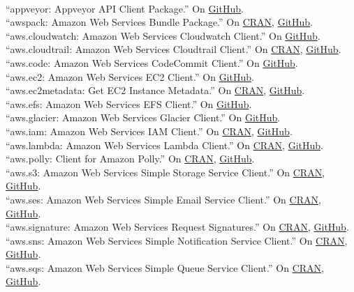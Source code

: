 \documentclass[12pt]{article}
\newcommand{\topic}[1]{\pagebreak[3]\indent {\color{lg}{\footnotesize #1 }}\\}
\newcommand{\entry}[1]{\indent {\color{lg}\guillemotright}\hspace{2pt}#1\vspace{.25em}\\}
\begin{document}
	\topic{R packages contributed to the cloudyr project}
	\entry{``appveyor: Appveyor API Client Package.'' On \href{https://github.com/cloudyr/appveyor}{GitHub}.}
	\entry{``awspack: Amazon Web Services Bundle Package.'' On \href{https://cran.r-project.org/package=awspack}{CRAN}, \href{https://github.com/cloudyr/awspack}{GitHub}.}
	\entry{``aws.cloudwatch: Amazon Web Services Cloudwatch Client.'' On \href{https://github.com/cloudyr/aws.cloudwatch}{GitHub}.}
	\entry{``aws.cloudtrail: Amazon Web Services Cloudtrail Client.'' On \href{https://cran.r-project.org/package=aws.cloudtrail}{CRAN}, \href{https://github.com/cloudyr/aws.cloudtrail}{GitHub}.}
	\entry{``aws.code: Amazon Web Services CodeCommit Client.'' On \href{https://github.com/cloudyr/aws.code}{GitHub}.}
	\entry{``aws.ec2: Amazon Web Services EC2 Client.'' On \href{https://github.com/cloudyr/aws.ec2}{GitHub}.}
	\entry{``aws.ec2metadata: Get EC2 Instance Metadata.'' On \href{https://cran.r-project.org/package=aws.ec2metadata}{CRAN}, \href{https://github.com/cloudyr/aws.ec2metadata}{GitHub}.}
	\entry{``aws.efs: Amazon Web Services EFS Client.'' On \href{https://github.com/cloudyr/aws.efs}{GitHub}.}
	\entry{``aws.glacier: Amazon Web Services Glacier Client.'' On \href{https://github.com/cloudyr/aws.glacier}{GitHub}.}
	\entry{``aws.iam: Amazon Web Services IAM Client.'' On \href{https://cran.r-project.org/package=aws.iam}{CRAN}, \href{https://github.com/cloudyr/aws.iam}{GitHub}.}
	\entry{``aws.lambda: Amazon Web Services Lambda Client.'' On \href{https://cran.r-project.org/package=aws.lambda}{CRAN}, \href{https://github.com/cloudyr/aws.lambda}{GitHub}.}
	\entry{``aws.polly: Client for Amazon Polly.'' On \href{https://cran.r-project.org/package=polly}{CRAN}, \href{https://github.com/cloudyr/aws.polly}{GitHub}.}
	\entry{``aws.s3: Amazon Web Services Simple Storage Service Client.'' On \href{https://cran.r-project.org/package=aws.s3}{CRAN}, \href{https://github.com/cloudyr/aws.s3}{GitHub}.}
	\entry{``aws.ses: Amazon Web Services Simple Email Service Client.'' On \href{https://cran.r-project.org/package=aws.ses}{CRAN}, \href{https://github.com/cloudyr/aws.ses}{GitHub}.}
	\entry{``aws.signature: Amazon Web Services Request Signatures.'' On \href{https://cran.r-project.org/package=aws.signature}{CRAN}, \href{https://github.com/cloudyr/aws.signature}{GitHub}.}
	\entry{``aws.sns: Amazon Web Services Simple Notification Service Client.'' On \href{https://cran.r-project.org/package=aws.sns}{CRAN}, \href{https://github.com/cloudyr/aws.sns}{GitHub}.}
	\entry{``aws.sqs: Amazon Web Services Simple Queue Service Client.'' On \href{https://cran.r-project.org/package=aws.sqs}{CRAN}, \href{https://github.com/cloudyr/aws.sqs}{GitHub}.}
\end{document}
